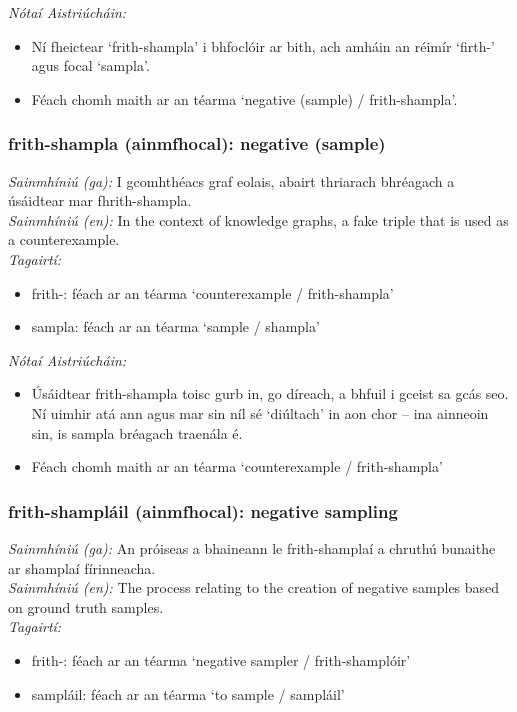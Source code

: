  \noindent \textit{Nótaí Aistriúcháin:}
\begin{itemize}
	\item Ní fheictear `frith-shampla' i bhfoclóir ar bith, ach amháin an réimír `firth-' agus focal `sampla'.
	\item Féach chomh maith ar an téarma `negative (sample) / frith-shampla'.
\end{itemize}


\subsubsection*{frith-shampla (ainmfhocal): negative (sample)}
 \noindent \textit{Sainmhíniú (ga):} I gcomhthéacs graf eolais, abairt thriarach bhréagach a úsáidtear mar fhrith-shampla.
\\
 \noindent \textit{Sainmhíniú (en):} In the context of knowledge graphs, a fake triple that is used as a counterexample.
\\
 \noindent \textit{Tagairtí:}
\begin{itemize}
	\item frith-: féach ar an téarma `counterexample / frith-shampla'
	\item sampla: féach ar an téarma `sample / shampla'
\end{itemize}

 \noindent \textit{Nótaí Aistriúcháin:}
\begin{itemize}
	\item Úsáidtear frith-shampla toisc gurb in, go díreach, a bhfuil i gceist sa gcás seo. Ní uimhir atá ann agus mar sin níl sé `diúltach' in aon chor -- ina ainneoin sin, is sampla bréagach traenála é.
	\item Féach chomh maith ar an téarma `counterexample / frith-shampla'
\end{itemize}


\subsubsection*{frith-shampláil (ainmfhocal): negative sampling}
 \noindent \textit{Sainmhíniú (ga):} An próiseas a bhaineann le frith-shamplaí a chruthú bunaithe ar shamplaí fírinneacha.
\\
 \noindent \textit{Sainmhíniú (en):} The process relating to the creation of negative samples based on ground truth samples.
\\
 \noindent \textit{Tagairtí:}
\begin{itemize}
	\item frith-: féach ar an téarma `negative sampler / frith-shamplóir'
	\item sampláil: féach ar an téarma `to sample / sampláil'
\end{itemize}

